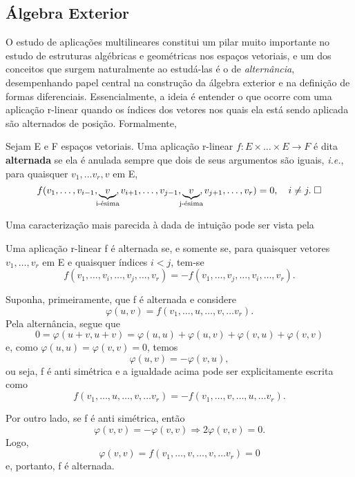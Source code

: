 \documentclass[../differential_forms.tex]{subfiles}
\begin{document}
\subsection{Álgebra Exterior}
O estudo de aplicações multilineares constitui um pilar muito importante no estudo de estruturas algébricas e geométricas nos espaços vetoriais, e um dos conceitos que surgem naturalmente ao estudá-las é o de \textit{alternância}, desempenhando papel central na construção da álgebra exterior e na definição de formas diferenciais. Essencialmente, a ideia é entender o que ocorre com uma aplicação r-linear quando os índices dos vetores nos quais ela está sendo aplicada são alternados de posição. Formalmente, 
\begin{def*}
  Sejam E e F espaços vetoriais. Uma aplicação r-linear \(f:E\times \dotsc \times E\rightarrow F\) é dita \textbf{alternada} se ela é anulada sempre que dois de seus argumentos são iguais, \textit{i.e.}, para quaisquer \(v_1,\dotsc v_r, v\) em E, 
    \[
      f(v_1,\dotsc , v_{i-1}, \underbrace{v}_{\mathclap{\text{i-ésima}}}, v_{i+1},\dotsc , v_{j-1}, \underbrace{v}_{\mathclap{\text{j-ésima}}}, v_{j+1},\dotsc , v_{r})=0, \quad i\neq j. \; \square
    \]
\end{def*}
Uma caracterização mais parecida à dada de intuição pode ser vista pela 
\begin{prop*}
  Uma aplicação r-linear f é alternada se, e somente se, para quaisquer vetores \(v_1,\dotsc , v_{r}\) em E e quaisquer índices \(i<j\), tem-se 
    \[
      f(v_1,\dotsc ,v_{i},\dotsc ,v_{j},\dotsc ,v_r)=-f(v_1,\dotsc ,v_{j},\dotsc ,v_{i},\dotsc ,v_r).
    \]
\end{prop*}
\begin{proof*}
  Suponha, primeiramente, que f é alternada e considere 
    \[
      \varphi (u, v)=f(v_1,\dotsc , u,\dotsc ,v,\dotsc v_r).
    \]
    Pela alternância, segue que 
      \[
        0=\varphi (u+v, u+v) = \varphi(u, u)+\varphi (u, v)+\varphi (v, u)+\varphi (v, v)
      \]
      e, como \(\varphi (u, u)=\varphi (v, v)=0\), temos 
        \[
          \varphi (u,v) = -\varphi (v, u),
        \]
        ou seja, f é anti simétrica e a igualdade acima pode ser explicitamente escrita como 
          \[
            f(v_1,\dotsc , u,\dotsc ,v,\dotsc v_r) = -f(v_1,\dotsc , v,\dotsc ,u,\dotsc v_r).
          \]

          Por outro lado, se f é anti simétrica, então 
            \[
              \varphi (v, v)=-\varphi (v, v) \Rightarrow 2\varphi (v, v)=0.
            \]
            Logo, 
              \[
                \varphi (v, v)=f(v_1,\dotsc , v,\dotsc ,v,\dotsc v_r) = 0
              \]
              e, portanto, f é alternada. \qedsymbol
\end{proof*}
\end{document}
